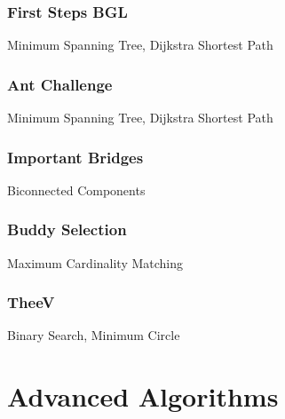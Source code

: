 \documentclass[10pt,a4paper,twoside]{report}
\begin{document}
\subsection*{First Steps BGL}
\begin{keywords}Minimum Spanning Tree, Dijkstra Shortest Path\end{keywords}


\newpage
\subsection*{Ant Challenge}
\begin{keywords}Minimum Spanning Tree, Dijkstra Shortest Path\end{keywords}


\newpage
\subsection*{Important Bridges}
\begin{keywords}Biconnected Components\end{keywords}


\newpage
\subsection*{Buddy Selection}
\begin{keywords}Maximum Cardinality Matching\end{keywords}


\newpage
\subsection*{TheeV}
\begin{keywords}Binary Search, Minimum Circle\end{keywords}




\chapter{Advanced Algorithms}
\end{document}
